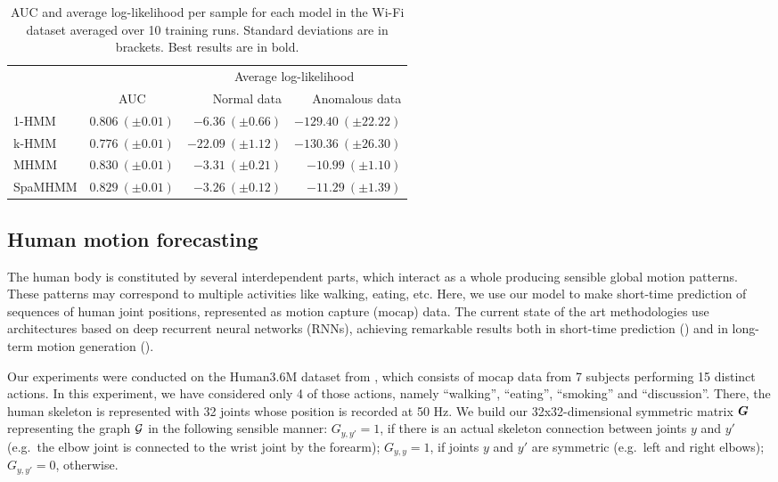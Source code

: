 \begin{table}
	\centering
	\begin{tabular}{l|r|r r}
		\multicolumn{1}{c}{} & \multicolumn{1}{c}{} & \multicolumn{2}{c}{Average log-likelihood} \\
		& \multicolumn{1}{c|}{AUC} & Normal data & Anomalous data \\
		\hline
		1-HMM & $0.806~(\pm 0.01)$ & $-6.36~(\pm 0.66)$ & $-129.40~(\pm 22.22)$ \\
		k-HMM & $0.776~(\pm 0.01)$ & $-22.09~(\pm 1.12)$ & $\mathbf{-130.36}~(\pm 26.30)$ \\
		MHMM & $\mathbf{0.830}~(\pm 0.01)$ & $-3.31~(\pm 0.21)$ & $-10.99~(\pm 1.10)$ \\
		SpaMHMM & $0.829~(\pm 0.01)$ & $\mathbf{-3.26}~(\pm 0.12)$ & $-11.29~(\pm 1.39)$ \\
	\end{tabular}
	\caption{AUC and average log-likelihood per sample for each model in the Wi-Fi dataset averaged over 10 training runs. Standard deviations are in brackets. Best results are in bold.}
	\label{tbl:spamhmm_wifi_results}
\end{table}

\subsection{Human motion forecasting}
\label{sec:h36m}
The human body is constituted by several interdependent parts, which interact as a whole producing sensible global motion patterns. These patterns may correspond to multiple activities like walking, eating, etc. Here, we use our model to make short-time prediction of sequences of human joint positions, represented as motion capture (mocap) data. The current state of the art methodologies use architectures based on deep recurrent neural networks (RNNs), achieving remarkable results both in short-time prediction (\citet{Fragkiadaki2015, Martinez2017}) and in long-term motion generation (\citet{Jain2016, Pavllo2018}).

Our experiments were conducted on the Human3.6M dataset from \citet{Ionescu2011, Ionescu2014}, which consists of mocap data from 7 subjects performing 15 distinct actions. In this experiment, we have considered only 4 of those actions, namely ``walking'', ``eating'', ``smoking'' and ``discussion''. There, the human skeleton is represented with 32 joints whose position is recorded at 50 Hz. We build our 32x32-dimensional symmetric matrix ${\bm{G}}$ representing the graph ${\mathcal{G}}$ in the following sensible manner: $G_{y,y'}=1$, if there is an actual skeleton connection between joints $y$ and $y'$ (e.g.\  the elbow joint is connected to the wrist joint by the forearm); $G_{y,y}=1$, if joints $y$ and $y'$ are symmetric (e.g.\  left and right elbows); $G_{y,y'}=0$, otherwise.

